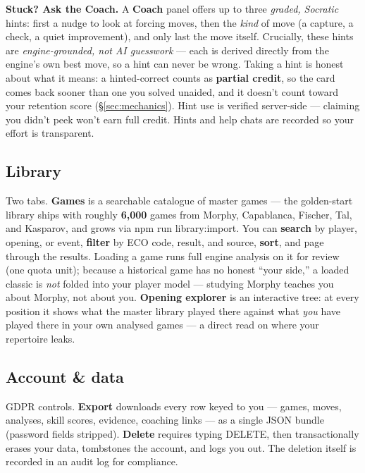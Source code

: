 \documentclass[11pt]{article}
\newcommand{\code}[1]{{\ttfamily #1}}
\begin{document}
\textbf{Stuck? Ask the Coach.} A \textbf{Coach} panel offers up to three
\emph{graded, Socratic} hints: first a nudge to look at forcing moves, then the
\emph{kind} of move (a capture, a check, a quiet improvement), and only last the
move itself. Crucially, these hints are \emph{engine-grounded, not AI guesswork}
--- each is derived directly from the engine's own best move, so a hint can
never be wrong. Taking a hint is honest about what it means: a hinted-correct
counts as \textbf{partial credit}, so the card comes back sooner than one you
solved unaided, and it doesn't count toward your retention score
(\S\ref{sec:mechanics}). Hint use is verified server-side --- claiming you
didn't peek won't earn full credit. Hints and help chats are recorded so your
effort is transparent.

\subsection{Library}

Two tabs. \textbf{Games} is a searchable catalogue of master games --- the
golden-start library ships with roughly \textbf{6{,}000} games from Morphy,
Capablanca, Fischer, Tal, and Kasparov, and grows via \code{npm run
library:import}. You can \textbf{search} by player, opening, or event,
\textbf{filter} by ECO code, result, and source, \textbf{sort}, and page through
the results. Loading a game runs full engine analysis on it for review (one
quota unit); because a historical game has no honest ``your side,'' a loaded
classic is \emph{not} folded into your player model --- studying Morphy teaches
you about Morphy, not about you. \textbf{Opening explorer} is an interactive
tree: at every position it shows what the master library played there against
what \emph{you} have played there in your own analysed games --- a direct read
on where your repertoire leaks.

\subsection{Account \& data}

GDPR controls. \textbf{Export} downloads every row keyed to you --- games,
moves, analyses, skill scores, evidence, coaching links --- as a single JSON
bundle (password fields stripped). \textbf{Delete} requires typing
\code{DELETE}, then transactionally erases your data, tombstones the account,
and logs you out. The deletion itself is recorded in an audit log for
compliance.
\end{document}
